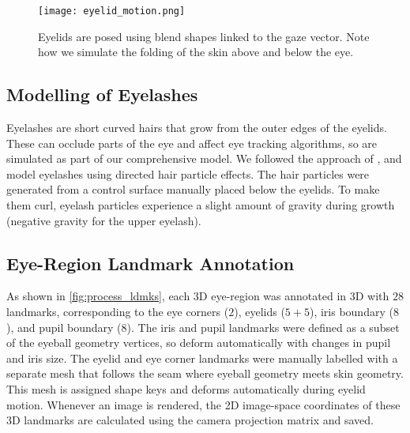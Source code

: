 \begin{figure}
    \texttt{[image: eyelid\_motion.png]}
    \caption{Eyelids are posed using blend shapes linked to the gaze vector. Note how we simulate the folding of the skin above and below the eye.}
    \label{fig:eyelids}
\end{figure}

\subsection{Modelling of Eyelashes}

Eyelashes are short curved hairs that grow from the outer edges of the eyelids.
These can occlude parts of the eye and affect eye tracking algorithms, so are simulated as part of our comprehensive model.
We followed the approach of \citet{swirski2014rendering}, and model eyelashes using directed hair particle effects.
The hair particles were generated from a control surface manually placed below the eyelids.
To make them curl, eyelash particles experience a slight amount of gravity during growth (negative gravity for the upper eyelash).

\subsection{Eye-Region Landmark Annotation}

As shown in \autoref{fig:process_ldmks}, each 3D eye-region was annotated in 3D with $28$ landmarks, corresponding to the eye corners ($2$), eyelids ($5\!+\!5$), iris boundary ($8$), and pupil boundary ($8$).
The iris and pupil landmarks were defined as a subset of the eyeball geometry vertices, so deform automatically with changes in pupil and iris size.
The eyelid and eye corner landmarks were manually labelled with a separate mesh that follows the seam where eyeball geometry meets skin geometry.
This mesh is assigned shape keys and deforms automatically during eyelid motion.
%
Whenever an image is rendered, the 2D image-space coordinates of these 3D landmarks are calculated using the camera projection matrix and saved.
